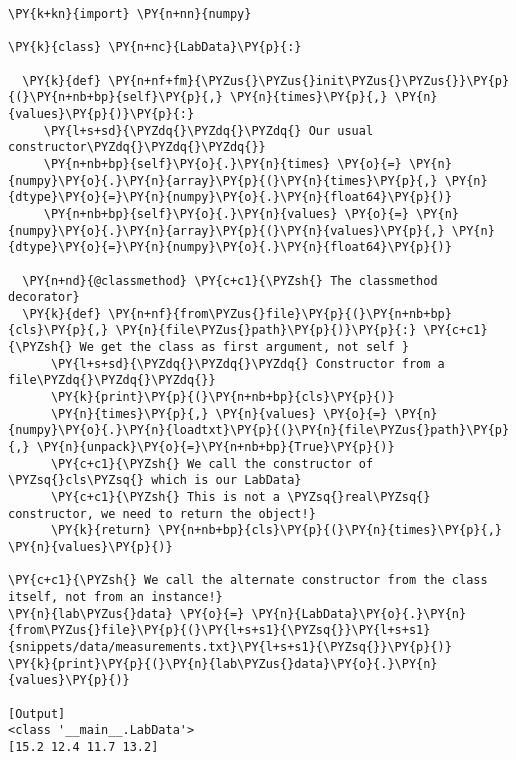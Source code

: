 \begin{Verbatim}[label=\makebox{\url{https://github.com/lucabaldini/cmepda/tree/master/slides/latex/snippets/classmethod.py}},commandchars=\\\{\}]
\PY{k+kn}{import} \PY{n+nn}{numpy}

\PY{k}{class} \PY{n+nc}{LabData}\PY{p}{:}
  
  \PY{k}{def} \PY{n+nf+fm}{\PYZus{}\PYZus{}init\PYZus{}\PYZus{}}\PY{p}{(}\PY{n+nb+bp}{self}\PY{p}{,} \PY{n}{times}\PY{p}{,} \PY{n}{values}\PY{p}{)}\PY{p}{:}
     \PY{l+s+sd}{\PYZdq{}\PYZdq{}\PYZdq{} Our usual constructor\PYZdq{}\PYZdq{}\PYZdq{}}
     \PY{n+nb+bp}{self}\PY{o}{.}\PY{n}{times} \PY{o}{=} \PY{n}{numpy}\PY{o}{.}\PY{n}{array}\PY{p}{(}\PY{n}{times}\PY{p}{,} \PY{n}{dtype}\PY{o}{=}\PY{n}{numpy}\PY{o}{.}\PY{n}{float64}\PY{p}{)}
     \PY{n+nb+bp}{self}\PY{o}{.}\PY{n}{values} \PY{o}{=} \PY{n}{numpy}\PY{o}{.}\PY{n}{array}\PY{p}{(}\PY{n}{values}\PY{p}{,} \PY{n}{dtype}\PY{o}{=}\PY{n}{numpy}\PY{o}{.}\PY{n}{float64}\PY{p}{)}

  \PY{n+nd}{@classmethod} \PY{c+c1}{\PYZsh{} The classmethod decorator}
  \PY{k}{def} \PY{n+nf}{from\PYZus{}file}\PY{p}{(}\PY{n+nb+bp}{cls}\PY{p}{,} \PY{n}{file\PYZus{}path}\PY{p}{)}\PY{p}{:} \PY{c+c1}{\PYZsh{} We get the class as first argument, not self }
      \PY{l+s+sd}{\PYZdq{}\PYZdq{}\PYZdq{} Constructor from a file\PYZdq{}\PYZdq{}\PYZdq{}}
      \PY{k}{print}\PY{p}{(}\PY{n+nb+bp}{cls}\PY{p}{)}
      \PY{n}{times}\PY{p}{,} \PY{n}{values} \PY{o}{=} \PY{n}{numpy}\PY{o}{.}\PY{n}{loadtxt}\PY{p}{(}\PY{n}{file\PYZus{}path}\PY{p}{,} \PY{n}{unpack}\PY{o}{=}\PY{n+nb+bp}{True}\PY{p}{)}
      \PY{c+c1}{\PYZsh{} We call the constructor of \PYZsq{}cls\PYZsq{} which is our LabData}
      \PY{c+c1}{\PYZsh{} This is not a \PYZsq{}real\PYZsq{} constructor, we need to return the object!}
      \PY{k}{return} \PY{n+nb+bp}{cls}\PY{p}{(}\PY{n}{times}\PY{p}{,} \PY{n}{values}\PY{p}{)}

\PY{c+c1}{\PYZsh{} We call the alternate constructor from the class itself, not from an instance!}
\PY{n}{lab\PYZus{}data} \PY{o}{=} \PY{n}{LabData}\PY{o}{.}\PY{n}{from\PYZus{}file}\PY{p}{(}\PY{l+s+s1}{\PYZsq{}}\PY{l+s+s1}{snippets/data/measurements.txt}\PY{l+s+s1}{\PYZsq{}}\PY{p}{)}
\PY{k}{print}\PY{p}{(}\PY{n}{lab\PYZus{}data}\PY{o}{.}\PY{n}{values}\PY{p}{)}

[Output]
<class '__main__.LabData'>
[15.2 12.4 11.7 13.2]
\end{Verbatim}